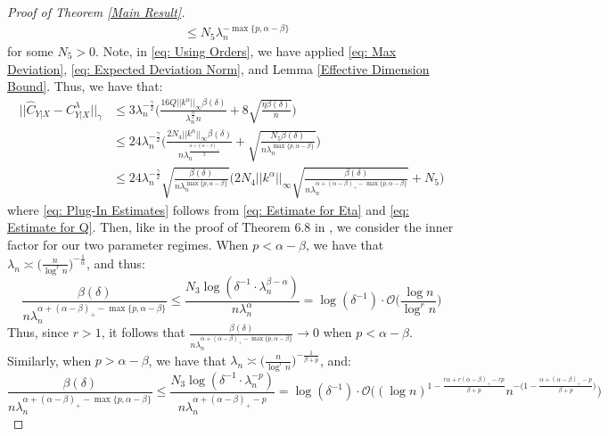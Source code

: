 \documentclass[accepted]{article}
\theoremstyle{definition}
\begin{document}
\begin{proof}[Proof of Theorem \ref{Main Result}]
\begin{align}
    & \leq N_5 \lambda_n^{-\max\{p, \alpha - \beta\}} \label{eq: Estimate for Eta}
\end{align}
for some $N_5 > 0$. Note, in \eqref{eq: Using Orders}, we have applied \eqref{eq: Max Deviation}, \eqref{eq: Expected Deviation Norm}, and Lemma \ref{Effective Dimension Bound}. Thus, we have that:
\begin{align}
    ||\hat{C}_{Y|X} - C^{\lambda}_{Y|X}||_{\gamma} & \leq 3\lambda_n^{-\frac{\gamma}{2}}\Big(\frac{16Q||k^{\alpha}||_{\infty}\beta(\delta)}{\lambda_n^{\frac{\alpha}{2}}n} + 8\sqrt{\frac{\eta\beta(\delta)}{n}}\Big) \nonumber \\
    & \leq 24\lambda_n^{-\frac{\gamma}{2}}\Big(\frac{2N_4||k^{\alpha}||_{\infty}\beta(\delta)}{n\lambda_n^{\frac{\alpha + (\alpha - \beta)_{+}}{2}}} + \sqrt{\frac{N_5\beta(\delta)}{n\lambda_n^{\max\{p, \alpha - \beta\}}}}\Big) \label{eq: Plug-In Estimates}\\
    & \leq 24\lambda_n^{-\frac{\gamma}{2}}\sqrt{\frac{\beta(\delta)}{n\lambda_n^{\max\{p, \alpha - \beta\}}}} \Big(2N_4||k^{\alpha}||_{\infty}\sqrt{\frac{\beta(\delta)}{n\lambda_n^{\alpha + (\alpha - \beta)_{+} - \max\{p, \alpha - \beta\}}}} + N_5\Big) \nonumber
\end{align}
where \eqref{eq: Plug-In Estimates} follows from \eqref{eq: Estimate for Eta} and \eqref{eq: Estimate for Q}. Then, like in the proof of Theorem 6.8 in \cite{fischer2020sobolev}, we consider the inner factor for our two parameter regimes. When $p < \alpha - \beta$, we have that $\lambda_n \asymp \Big(\frac{n}{\log^r n}\Big)^{-\frac{1}{\alpha}}$, and thus:
\begin{equation*}
    \frac{\beta(\delta)}{n\lambda_n^{\alpha + (\alpha - \beta)_{+} - \max\{p, \alpha - \beta \}}} \leq \frac{N_3\log (\delta^{-1} \cdot \lambda_n^{\beta - \alpha})}{n\lambda^{\alpha}_n} = \log(\delta^{-1}) \cdot \mathcal{O}\Big(\frac{\log n}{\log^{r} n}\Big)
\end{equation*}
Thus, since $r > 1$, it follows that $\frac{\beta(\delta)}{n\lambda_n^{\alpha + (\alpha - \beta)_{+} - \max\{p, \alpha - \beta \}}} \to 0$ when $p < \alpha - \beta$. Similarly, when $p > \alpha - \beta$, we have that $\lambda_n \asymp \Big(\frac{n}{\log^r n}\Big)^{-\frac{1}{\beta + p}}$, and:
\begin{equation*}
    \frac{\beta(\delta)}{n\lambda_n^{\alpha + (\alpha - \beta)_{+} - \max\{p, \alpha - \beta\}}} \leq \frac{N_3\log (\delta^{-1} \cdot \lambda_n^{-p})}{n\lambda_n^{\alpha + (\alpha - \beta)_{+} - p}} = \log(\delta^{-1}) \cdot \mathcal{O}\Big((\log n)^{1 - \frac{r\alpha + r(\alpha - \beta)_{+} - rp}{\beta + p}}n^{-\Big(1 - \frac{\alpha + (\alpha - \beta)_{+} - p}{\beta + p}\Big)}\Big)

\end{equation*}
\end{proof}
\end{document}
